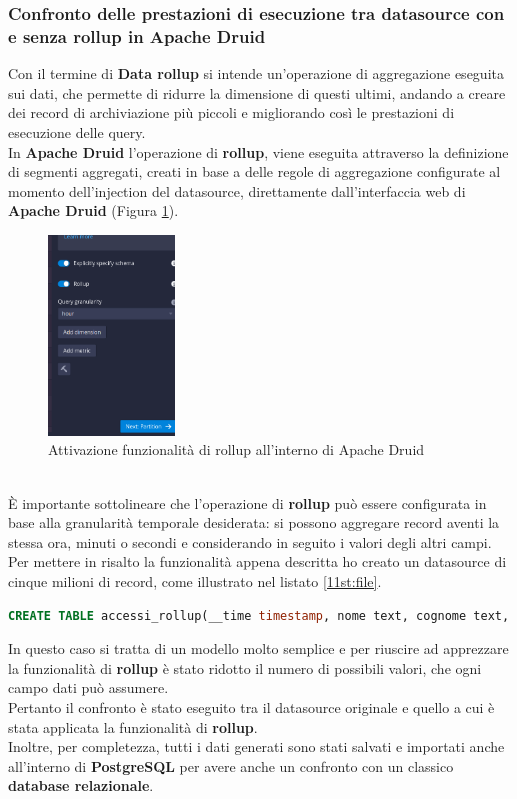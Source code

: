\subsubsection{Confronto delle prestazioni di esecuzione tra datasource con e senza rollup in Apache Druid}\label{sec:confronto_prestazioni2}
Con il termine di \textbf{Data rollup} si intende un'operazione di aggregazione eseguita 
sui dati, che permette di ridurre la dimensione di questi ultimi, andando a creare dei record di archiviazione più piccoli e migliorando così 
le prestazioni di esecuzione delle query.\\
In \textbf{Apache Druid} l'operazione di \textbf{rollup}, viene eseguita attraverso la 
definizione di segmenti aggregati, creati in base a delle regole di aggregazione configurate al momento dell'\gls{injection}{} del \gls{datasource}{}, direttamente dall'interfaccia web di \textbf{Apache Druid} (Figura \ref{fig:rollup}).
\begin{figure}[h]
  \centering
  \includegraphics[width=0.3\textwidth]{images/percorso/test_rollup.png}
  \caption{Attivazione funzionalità di rollup all'interno di Apache Druid}
  \label{fig:rollup}
\end{figure}
\\
È importante sottolineare che l'operazione di \textbf{rollup} può essere configurata in base 
alla granularità temporale desiderata: si possono aggregare record aventi la stessa ora, minuti o secondi e considerando in seguito i  valori degli altri campi.\\
Per mettere in risalto la funzionalità appena descritta ho creato un \gls{datasource}{} di cinque milioni di record, come illustrato nel listato \ref{11st:file}.
\begin{lstlisting}[language=SQL,label=11st:file]
    CREATE TABLE accessi_rollup(__time timestamp, nome text, cognome text, citta text, stato text, datan date, istruzione text, hobby text)
\end{lstlisting}
In questo caso si tratta di un modello molto semplice 
e per riuscire ad apprezzare la funzionalità di \textbf{rollup} è stato ridotto
il numero di possibili valori, che ogni campo dati può assumere.\\
Pertanto il confronto è stato eseguito tra il \gls{datasource}{} originale e quello a cui è stata applicata la funzionalità di \textbf{rollup}.\\
Inoltre, per completezza, tutti i dati generati sono stati salvati e importati anche all'interno di \textbf{PostgreSQL} per avere 
anche un confronto con un classico \textbf{database relazionale}.

